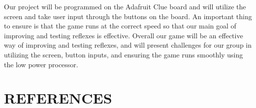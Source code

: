 \documentclass[12pt]{article}
\begin{document}
Our project will be programmed on the Adafruit Clue board and will utilize the screen and take user input through the buttons on the board. An important thing to ensure is that the game runs at the correct speed so that our main goal of improving and testing reflexes is effective. Overall our game will be an effective way of improving and testing reflexes, and will present challenges for our group in utilizing the screen, button inputs, and ensuring the game runs smoothly using the low power processor.

\section{REFERENCES}



\newpage
\printbibliography
%
%
\end{document}
